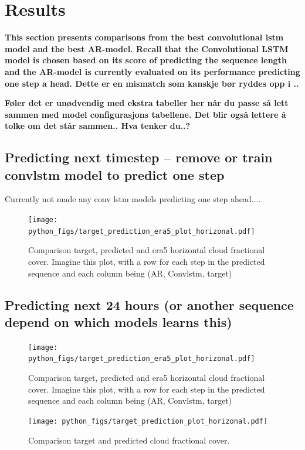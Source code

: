 \section{Results}
\textbf{This section presents comparisons from the best convolutional lstm model and the best AR-model. Recall that the Convolutional LSTM model is chosen based on its score of predicting the sequence length and the AR-model is currently evaluated on its performance predicting one step a head. \textbf{Dette er en mismatch som kanskje bør ryddes opp i ..}}

\textbf{Føler det er unødvendig med ekstra tabeller her når du passe så lett sammen med model configurasjons tabellene. Det blir også lettere å tolke om det står sammen.. Hva tenker du..? }

\subsection{Predicting next timestep -- remove or train convlstm model to predict one step}
Currently not made any conv lstm models predicting one step ahead....
\begin{figure}[ht]
    \centering
    \texttt{[image: python\_figs/target\_prediction\_era5\_plot\_horizonal.pdf]}
    \caption{Comparison target, predicted and era5 horizontal cloud fractional cover. Imagine this plot, with a row for each step in the predicted sequence and each column being (AR, Convlstm, target)}
    \label{fig:target_predict_era5_horizontal}
\end{figure}


\subsection{Predicting next 24 hours (or another sequence depend on which models learns this)}
\begin{figure}[ht]
    \centering
    \texttt{[image: python\_figs/target\_prediction\_era5\_plot\_horizonal.pdf]}
    \caption{Comparison target, predicted and era5 horizontal cloud fractional cover. Imagine this plot, with a row for each step in the predicted sequence and each column being (AR, Convlstm, target)}
    \label{fig:target_predict_era5_horizontal}
\end{figure}

\begin{figure}[ht]
    \centering
    \texttt{[image: python\_figs/target\_prediction\_plot\_horizonal.pdf]}
    \caption{Comparison target and predicted cloud fractional cover.}
    \label{fig:target_predict_horizontal}
\end{figure}

